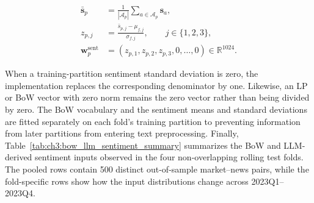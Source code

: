 \begin{equation}\label{eq:ch3:rq2_sentiment_pair}
\begin{aligned}
\bar{\mathbf{s}}_p
&=\frac{1}{|\mathcal{A}_p|}
\sum_{a\in\mathcal{A}_p}\mathbf{s}_a,\\
z_{p,j}
&=\frac{\bar{s}_{p,j}-\mu_{f,j}}{\sigma_{f,j}},
\qquad j\in\{1,2,3\},\\
\mathbf{w}^{\mathrm{sent}}_p
&=(z_{p,1},z_{p,2},z_{p,3},0,\ldots,0)
\in\mathbb{R}^{1024}.
\end{aligned}
\end{equation}

When a training-partition sentiment standard deviation is zero, the
implementation replaces the corresponding denominator by one. Likewise, an
LP or BoW vector with zero norm remains the zero vector rather than being
divided by zero. The BoW vocabulary and the sentiment means and standard
deviations are fitted separately on each fold's training partition to
preventing information from later partitions from entering text preprocessing.
Finally, Table~\ref{tab:ch3:bow_llm_sentiment_summary} summarizes the BoW and
LLM-derived sentiment inputs observed in the four non-overlapping rolling test
folds. The pooled rows contain 500 distinct out-of-sample market--news pairs,
while the fold-specific rows show how the input distributions change across
2023Q1--2023Q4.

